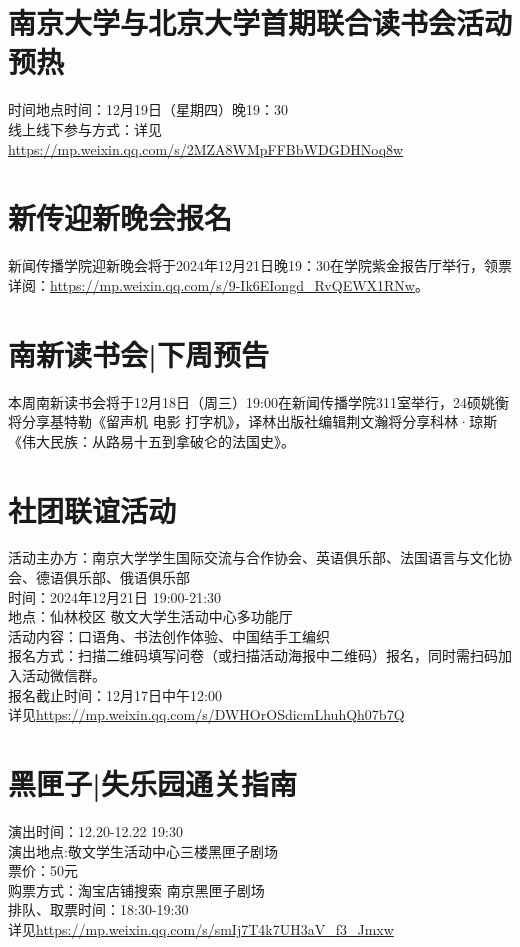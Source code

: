 \documentclass[letterpaper, 12pt]{article}
\begin{document}
\begin{multicols}{2}
\section{南京大学与北京大学首期联合读书会活动预热}
时间地点时间：12月19日（星期四）晚19：30\\
线上线下参与方式：详见\url{https://mp.weixin.qq.com/s/2MZA8WMpFFBbWDGDHNoq8w}\\
\section{新传迎新晚会报名}
新闻传播学院迎新晚会将于2024年12月21日晚19：30在学院紫金报告厅举行，领票详阅：\url{https://mp.weixin.qq.com/s/9-Ik6EIongd_RvQEWX1RNw}。
\section{南新读书会|下周预告}
本周南新读书会将于12月18日（周三）19:00在新闻传播学院311室举行，24硕姚衡将分享基特勒《留声机 电影 打字机》，译林出版社编辑荆文瀚将分享科林·琼斯《伟大民族：从路易十五到拿破仑的法国史》。
\section{社团联谊活动}
活动主办方：南京大学学生国际交流与合作协会、英语俱乐部、法国语言与文化协会、德语俱乐部、俄语俱乐部\\
时间：2024年12月21日 19:00-21:30\\
地点：仙林校区 敬文大学生活动中心多功能厅\\
活动内容：口语角、书法创作体验、中国结手工编织\\
报名方式：扫描二维码填写问卷（或扫描活动海报中二维码）报名，同时需扫码加入活动微信群。\\
报名截止时间：12月17日中午12:00\\
详见\url{https://mp.weixin.qq.com/s/DWHOrOSdicmLhuhQh07b7Q}

\section{黑匣子|失乐园通关指南}
演出时间：12.20-12.22 19:30\\
演出地点:敬文学生活动中心三楼黑匣子剧场\\
票价：50元\\
购票方式：淘宝店铺搜索 南京黑匣子剧场\\
排队、取票时间：18:30-19:30\\
详见\url{https://mp.weixin.qq.com/s/smIj7T4k7UH3aV_f3_Jmxw}


\end{multicols}
\end{document}
